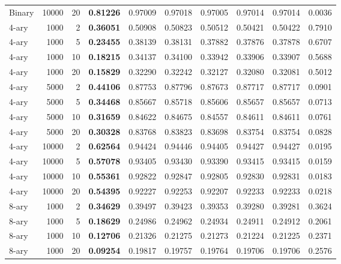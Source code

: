 \begin{longtable}{lrrrrrrrrr}
Binary & 10000 & 20 & \textbf{0.81226} & 0.97009 & 0.97018 & 0.97005 & \cellcolor{oursbg}0.97014 & 0.97014 & 0.0036 \\
4-ary & 1000 & 2 & \textbf{0.36051} & 0.50908 & 0.50823 & 0.50512 & \cellcolor{oursbg}0.50421 & 0.50422 & 0.7910 \\
4-ary & 1000 & 5 & \textbf{0.23455} & 0.38139 & 0.38131 & 0.37882 & \cellcolor{oursbg}0.37876 & 0.37878 & 0.6707 \\
4-ary & 1000 & 10 & \textbf{0.18215} & 0.34137 & 0.34100 & 0.33942 & \cellcolor{oursbg}0.33906 & 0.33907 & 0.5688 \\
4-ary & 1000 & 20 & \textbf{0.15829} & 0.32290 & 0.32242 & 0.32127 & \cellcolor{oursbg}0.32080 & 0.32081 & 0.5012 \\
4-ary & 5000 & 2 & \textbf{0.44106} & 0.87753 & 0.87796 & 0.87673 & \cellcolor{oursbg}0.87717 & 0.87717 & 0.0901 \\
4-ary & 5000 & 5 & \textbf{0.34468} & 0.85667 & 0.85718 & 0.85606 & \cellcolor{oursbg}0.85657 & 0.85657 & 0.0713 \\
4-ary & 5000 & 10 & \textbf{0.31659} & 0.84622 & 0.84675 & 0.84557 & \cellcolor{oursbg}0.84611 & 0.84611 & 0.0761 \\
4-ary & 5000 & 20 & \textbf{0.30328} & 0.83768 & 0.83823 & 0.83698 & \cellcolor{oursbg}0.83754 & 0.83754 & 0.0828 \\
4-ary & 10000 & 2 & \textbf{0.62564} & 0.94424 & 0.94446 & 0.94405 & \cellcolor{oursbg}0.94427 & 0.94427 & 0.0195 \\
4-ary & 10000 & 5 & \textbf{0.57078} & 0.93405 & 0.93430 & 0.93390 & \cellcolor{oursbg}0.93415 & 0.93415 & 0.0159 \\
4-ary & 10000 & 10 & \textbf{0.55361} & 0.92822 & 0.92847 & 0.92805 & \cellcolor{oursbg}0.92830 & 0.92831 & 0.0183 \\
4-ary & 10000 & 20 & \textbf{0.54395} & 0.92227 & 0.92253 & 0.92207 & \cellcolor{oursbg}0.92233 & 0.92233 & 0.0218 \\
8-ary & 1000 & 2 & \textbf{0.34629} & 0.39497 & 0.39423 & 0.39353 & \cellcolor{oursbg}0.39280 & 0.39281 & 0.3624 \\
8-ary & 1000 & 5 & \textbf{0.18629} & 0.24986 & 0.24962 & 0.24934 & \cellcolor{oursbg}0.24911 & 0.24912 & 0.2061 \\
8-ary & 1000 & 10 & \textbf{0.12706} & 0.21326 & 0.21275 & 0.21273 & \cellcolor{oursbg}0.21224 & 0.21225 & 0.2371 \\
8-ary & 1000 & 20 & \textbf{0.09254} & 0.19817 & 0.19757 & 0.19764 & \cellcolor{oursbg}0.19706 & 0.19706 & 0.2576 \\

\end{longtable}
